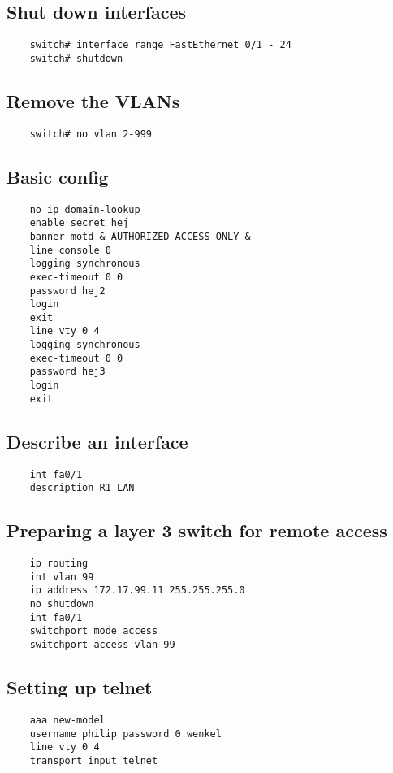 \documentclass{article}
\begin{document}
\subsection{Shut down interfaces}
\begin{verbatim}
	switch# interface range FastEthernet 0/1 - 24
	switch# shutdown
\end{verbatim}

\subsection{Remove the VLANs}
\begin{verbatim}
	switch# no vlan 2-999
\end{verbatim}

\subsection{Basic config}
\begin{verbatim}
	no ip domain-lookup
	enable secret hej
	banner motd & AUTHORIZED ACCESS ONLY &
	line console 0
	logging synchronous
	exec-timeout 0 0
	password hej2
	login
	exit
	line vty 0 4
	logging synchronous
	exec-timeout 0 0
	password hej3
	login
	exit
\end{verbatim}

\subsection{Describe an interface}
\begin{verbatim}
	int fa0/1
	description R1 LAN
\end{verbatim}

\subsection{Preparing a layer 3 switch for remote access}

\begin{verbatim}
	ip routing
	int vlan 99
	ip address 172.17.99.11 255.255.255.0
	no shutdown
	int fa0/1
	switchport mode access
	switchport access vlan 99
\end{verbatim}

\subsection{Setting up telnet}
\begin{verbatim}
	aaa new-model
	username philip password 0 wenkel
	line vty 0 4
	transport input telnet
\end{verbatim}
\end{document}
